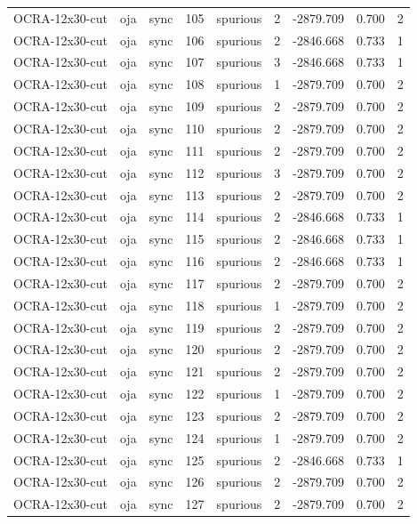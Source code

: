 \begin{tabular}{lllrlrrrr}
OCRA-12x30-cut & oja & sync & 105 & spurious & 2 & -2879.709 & 0.700 & 2 \\
OCRA-12x30-cut & oja & sync & 106 & spurious & 2 & -2846.668 & 0.733 & 1 \\
OCRA-12x30-cut & oja & sync & 107 & spurious & 3 & -2846.668 & 0.733 & 1 \\
OCRA-12x30-cut & oja & sync & 108 & spurious & 1 & -2879.709 & 0.700 & 2 \\
OCRA-12x30-cut & oja & sync & 109 & spurious & 2 & -2879.709 & 0.700 & 2 \\
OCRA-12x30-cut & oja & sync & 110 & spurious & 2 & -2879.709 & 0.700 & 2 \\
OCRA-12x30-cut & oja & sync & 111 & spurious & 2 & -2879.709 & 0.700 & 2 \\
OCRA-12x30-cut & oja & sync & 112 & spurious & 3 & -2879.709 & 0.700 & 2 \\
OCRA-12x30-cut & oja & sync & 113 & spurious & 2 & -2879.709 & 0.700 & 2 \\
OCRA-12x30-cut & oja & sync & 114 & spurious & 2 & -2846.668 & 0.733 & 1 \\
OCRA-12x30-cut & oja & sync & 115 & spurious & 2 & -2846.668 & 0.733 & 1 \\
OCRA-12x30-cut & oja & sync & 116 & spurious & 2 & -2846.668 & 0.733 & 1 \\
OCRA-12x30-cut & oja & sync & 117 & spurious & 2 & -2879.709 & 0.700 & 2 \\
OCRA-12x30-cut & oja & sync & 118 & spurious & 1 & -2879.709 & 0.700 & 2 \\
OCRA-12x30-cut & oja & sync & 119 & spurious & 2 & -2879.709 & 0.700 & 2 \\
OCRA-12x30-cut & oja & sync & 120 & spurious & 2 & -2879.709 & 0.700 & 2 \\
OCRA-12x30-cut & oja & sync & 121 & spurious & 2 & -2879.709 & 0.700 & 2 \\
OCRA-12x30-cut & oja & sync & 122 & spurious & 1 & -2879.709 & 0.700 & 2 \\
OCRA-12x30-cut & oja & sync & 123 & spurious & 2 & -2879.709 & 0.700 & 2 \\
OCRA-12x30-cut & oja & sync & 124 & spurious & 1 & -2879.709 & 0.700 & 2 \\
OCRA-12x30-cut & oja & sync & 125 & spurious & 2 & -2846.668 & 0.733 & 1 \\
OCRA-12x30-cut & oja & sync & 126 & spurious & 2 & -2879.709 & 0.700 & 2 \\
OCRA-12x30-cut & oja & sync & 127 & spurious & 2 & -2879.709 & 0.700 & 2 \\

\end{tabular}
